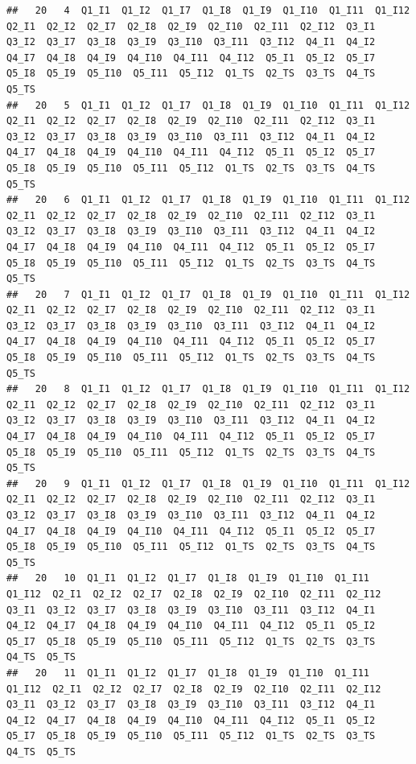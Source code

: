 \documentclass[]{book}
\begin{document}
\begin{verbatim}
##   20   4  Q1_I1  Q1_I2  Q1_I7  Q1_I8  Q1_I9  Q1_I10  Q1_I11  Q1_I12  Q2_I1  Q2_I2  Q2_I7  Q2_I8  Q2_I9  Q2_I10  Q2_I11  Q2_I12  Q3_I1  Q3_I2  Q3_I7  Q3_I8  Q3_I9  Q3_I10  Q3_I11  Q3_I12  Q4_I1  Q4_I2  Q4_I7  Q4_I8  Q4_I9  Q4_I10  Q4_I11  Q4_I12  Q5_I1  Q5_I2  Q5_I7  Q5_I8  Q5_I9  Q5_I10  Q5_I11  Q5_I12  Q1_TS  Q2_TS  Q3_TS  Q4_TS  Q5_TS
##   20   5  Q1_I1  Q1_I2  Q1_I7  Q1_I8  Q1_I9  Q1_I10  Q1_I11  Q1_I12  Q2_I1  Q2_I2  Q2_I7  Q2_I8  Q2_I9  Q2_I10  Q2_I11  Q2_I12  Q3_I1  Q3_I2  Q3_I7  Q3_I8  Q3_I9  Q3_I10  Q3_I11  Q3_I12  Q4_I1  Q4_I2  Q4_I7  Q4_I8  Q4_I9  Q4_I10  Q4_I11  Q4_I12  Q5_I1  Q5_I2  Q5_I7  Q5_I8  Q5_I9  Q5_I10  Q5_I11  Q5_I12  Q1_TS  Q2_TS  Q3_TS  Q4_TS  Q5_TS
##   20   6  Q1_I1  Q1_I2  Q1_I7  Q1_I8  Q1_I9  Q1_I10  Q1_I11  Q1_I12  Q2_I1  Q2_I2  Q2_I7  Q2_I8  Q2_I9  Q2_I10  Q2_I11  Q2_I12  Q3_I1  Q3_I2  Q3_I7  Q3_I8  Q3_I9  Q3_I10  Q3_I11  Q3_I12  Q4_I1  Q4_I2  Q4_I7  Q4_I8  Q4_I9  Q4_I10  Q4_I11  Q4_I12  Q5_I1  Q5_I2  Q5_I7  Q5_I8  Q5_I9  Q5_I10  Q5_I11  Q5_I12  Q1_TS  Q2_TS  Q3_TS  Q4_TS  Q5_TS
##   20   7  Q1_I1  Q1_I2  Q1_I7  Q1_I8  Q1_I9  Q1_I10  Q1_I11  Q1_I12  Q2_I1  Q2_I2  Q2_I7  Q2_I8  Q2_I9  Q2_I10  Q2_I11  Q2_I12  Q3_I1  Q3_I2  Q3_I7  Q3_I8  Q3_I9  Q3_I10  Q3_I11  Q3_I12  Q4_I1  Q4_I2  Q4_I7  Q4_I8  Q4_I9  Q4_I10  Q4_I11  Q4_I12  Q5_I1  Q5_I2  Q5_I7  Q5_I8  Q5_I9  Q5_I10  Q5_I11  Q5_I12  Q1_TS  Q2_TS  Q3_TS  Q4_TS  Q5_TS
##   20   8  Q1_I1  Q1_I2  Q1_I7  Q1_I8  Q1_I9  Q1_I10  Q1_I11  Q1_I12  Q2_I1  Q2_I2  Q2_I7  Q2_I8  Q2_I9  Q2_I10  Q2_I11  Q2_I12  Q3_I1  Q3_I2  Q3_I7  Q3_I8  Q3_I9  Q3_I10  Q3_I11  Q3_I12  Q4_I1  Q4_I2  Q4_I7  Q4_I8  Q4_I9  Q4_I10  Q4_I11  Q4_I12  Q5_I1  Q5_I2  Q5_I7  Q5_I8  Q5_I9  Q5_I10  Q5_I11  Q5_I12  Q1_TS  Q2_TS  Q3_TS  Q4_TS  Q5_TS
##   20   9  Q1_I1  Q1_I2  Q1_I7  Q1_I8  Q1_I9  Q1_I10  Q1_I11  Q1_I12  Q2_I1  Q2_I2  Q2_I7  Q2_I8  Q2_I9  Q2_I10  Q2_I11  Q2_I12  Q3_I1  Q3_I2  Q3_I7  Q3_I8  Q3_I9  Q3_I10  Q3_I11  Q3_I12  Q4_I1  Q4_I2  Q4_I7  Q4_I8  Q4_I9  Q4_I10  Q4_I11  Q4_I12  Q5_I1  Q5_I2  Q5_I7  Q5_I8  Q5_I9  Q5_I10  Q5_I11  Q5_I12  Q1_TS  Q2_TS  Q3_TS  Q4_TS  Q5_TS
##   20   10  Q1_I1  Q1_I2  Q1_I7  Q1_I8  Q1_I9  Q1_I10  Q1_I11  Q1_I12  Q2_I1  Q2_I2  Q2_I7  Q2_I8  Q2_I9  Q2_I10  Q2_I11  Q2_I12  Q3_I1  Q3_I2  Q3_I7  Q3_I8  Q3_I9  Q3_I10  Q3_I11  Q3_I12  Q4_I1  Q4_I2  Q4_I7  Q4_I8  Q4_I9  Q4_I10  Q4_I11  Q4_I12  Q5_I1  Q5_I2  Q5_I7  Q5_I8  Q5_I9  Q5_I10  Q5_I11  Q5_I12  Q1_TS  Q2_TS  Q3_TS  Q4_TS  Q5_TS
##   20   11  Q1_I1  Q1_I2  Q1_I7  Q1_I8  Q1_I9  Q1_I10  Q1_I11  Q1_I12  Q2_I1  Q2_I2  Q2_I7  Q2_I8  Q2_I9  Q2_I10  Q2_I11  Q2_I12  Q3_I1  Q3_I2  Q3_I7  Q3_I8  Q3_I9  Q3_I10  Q3_I11  Q3_I12  Q4_I1  Q4_I2  Q4_I7  Q4_I8  Q4_I9  Q4_I10  Q4_I11  Q4_I12  Q5_I1  Q5_I2  Q5_I7  Q5_I8  Q5_I9  Q5_I10  Q5_I11  Q5_I12  Q1_TS  Q2_TS  Q3_TS  Q4_TS  Q5_TS

\end{verbatim}
\end{document}
